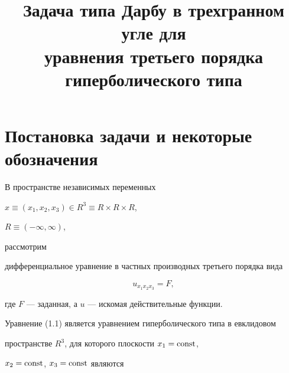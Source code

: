 

\title{Задача типа Дарбу в трехгранном угле для\\


уравнения третьего порядка гиперболического типа}





\date{}




\pagestyle{plain} %







\maketitle


\label{begin}





\section{Постановка задачи и некоторые обозначения}





В пространстве независимых переменных


$x\equiv(x_1,x_2,x_3)\in R^3\equiv R\times R\times R$,


$R\equiv(-\infty,\infty)$,


рассмотрим


дифференциальное уравнение в частных производных третьего порядка вида


\begin{equation}


u_{x_1x_2x_3}=F,


\end{equation}


где $F$ --- заданная, а $u$ --- искомая действительные функции.





Уравнение (1.1) является уравнением гиперболического типа в евклидовом


пространстве $R^3$, для которого плоскости $x_1=\operatorname{const}$,


$x_2=\operatorname{const}$, $x_3=\operatorname{const}$ являются



